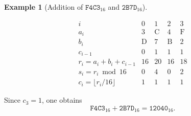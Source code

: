 \documentclass[11pt,a4paper]{article}
\theoremstyle{definition}
\newtheorem{example}{Example}[section]
\theoremstyle{remark}
\begin{document}
\begin{example}[Addition of $\texttt{F4C3}_{16}$ and $\texttt{2B7D}_{16}$]
\begin{center}
\begin{minipage}{.45\textwidth}
	\end{minipage}
	\begin{minipage}{.45\textwidth} \[
	\begin{array}{c|cccc}
		i & 0 & 1 & 2 & 3 \\ \hline
		a_i & 3 & \mathrm{C} & 4 & \mathrm{F} \\
		b_i & \mathrm{D} & 7 & \mathrm{B} & 2 \\
		c_{i-1} & 0 & 1 & 1 & 1 \\
		r_i=a_i+b_i+c_{i-1} & 16 & 20 & 16 & 18 \\
		s_i=r_i\bmod16 & 0 & 4 & 0 & 2 \\
		c_i=\lfloor r_i/16\rfloor & 1 & 1 & 1 & 1
	\end{array}\]
	\end{minipage}
	\end{center}
	Since $c_3=1$, one obtains \[
	\texttt{F4C3}_{16}+\texttt{2B7D}_{16} = \texttt{12040}_{16}.
	\]
\end{example}
\end{document}
